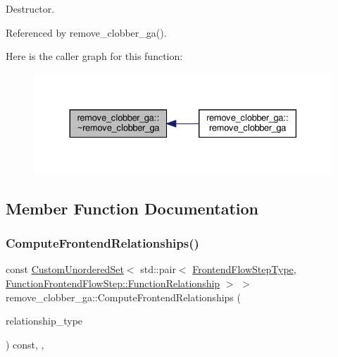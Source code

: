 Destructor. 



Referenced by remove\+\_\+clobber\+\_\+ga().

Here is the caller graph for this function\+:
\nopagebreak
\begin{figure}[H]
\begin{center}
\leavevmode
\includegraphics[width=330pt]{d5/de8/classremove__clobber__ga_a146625e689771f55b70d2334e4faef95_icgraph}
\end{center}
\end{figure}


\subsection{Member Function Documentation}
\mbox{\label{classremove__clobber__ga_a59b83e5d015d246d811dfc4e26928897}} 
\subsubsection{\texorpdfstring{Compute\+Frontend\+Relationships()}{ComputeFrontendRelationships()}}
{\footnotesize\ttfamily const \hyperlink{classCustomUnorderedSet}{Custom\+Unordered\+Set}$<$ std\+::pair$<$ \hyperlink{frontend__flow__step_8hpp_afeb3716c693d2b2e4ed3e6d04c3b63bb}{Frontend\+Flow\+Step\+Type}, \hyperlink{classFrontendFlowStep_af7cf30f2023e5b99e637dc2058289ab0}{Function\+Frontend\+Flow\+Step\+::\+Function\+Relationship} $>$ $>$ remove\+\_\+clobber\+\_\+ga\+::\+Compute\+Frontend\+Relationships (\begin{DoxyParamCaption}\item[{const \hyperlink{classDesignFlowStep_a723a3baf19ff2ceb77bc13e099d0b1b7}{Design\+Flow\+Step\+::\+Relationship\+Type}}]{relationship\+\_\+type }\end{DoxyParamCaption}) const\hspace{0.3cm}{\ttfamily [override]}, {\ttfamily [private]}, {\ttfamily [virtual]}}




